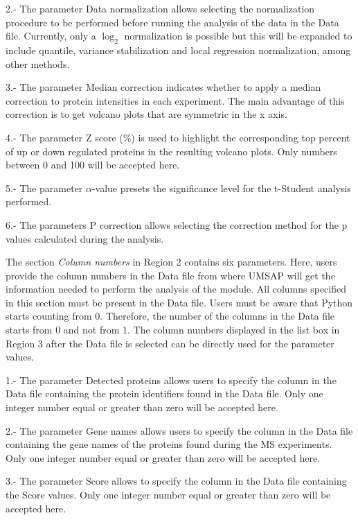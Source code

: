 \num{2}.-  The parameter Data normalization allows selecting the normalization procedure to be performed before running the analysis of the data in the Data file. Currently, only a $\log_2$ normalization is possible but this will be expanded to include quantile, variance stabilization and local regression normalization, among other methods. 

\num{3}.- The parameter Median correction indicates whether to apply a median correction to protein intensities in each experiment. The main advantage of this correction is to get volcano plots that are symmetric in the x axis.

\num{4}.- The parameter Z score (\%) is used to highlight the corresponding top percent of up or down regulated proteins in the resulting volcano plots. Only numbers between 0 and 100 will be accepted here.

\num{5}.- The parameter $\alpha$-value presets the significance level for the t-Student analysis performed.

\num{6}.- The parameters P correction allows selecting the correction method for the p values calculated during the analysis. 

The section \textit{Column numbers} in Region \num{2} contains six parameters. Here, users provide the column numbers in the Data file from where UMSAP will get the information needed to perform the analysis of the module. All columns specified  in this section must be present in the Data file. Users must be aware that Python starts counting from \num{0}. Therefore, the number of the columns in the Data file starts from \num{0} and not from \num{1}. The column numbers displayed in the list box in Region \num{3} after the Data file is selected can be directly used for the parameter values. 

\num{1}.- The parameter Detected proteins allows users to specify the column in the Data file containing the protein identifiers found in the Data file. Only one integer number equal or greater than zero will be accepted here. 

\num{2}.- The parameter Gene names allows users to specify the column in the Data file containing the gene names of the proteins found during the MS experiments. Only one integer number equal or greater than zero will be accepted here. 

\num{3}.- The parameter Score allows to specify the column in the Data file containing the Score values. Only one integer number equal or greater than zero will be accepted here. 

